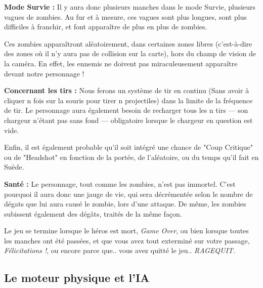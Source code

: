 \documentclass{article}
\begin{document}
\par
\textbf{Mode Survie :} Il y aura donc plusieurs manches dans le mode Survie, plusieurs vagues de zombies. Au fur et à mesure, ces vagues sont plus longues, sont plus difficiles à franchir, et font apparaître de plus en plus de zombies.
\newline

\par
Ces zombies apparaîtront aléatoirement, dans certaines zones libres (c'est-à-dire des zones où il n'y aura pas de collision sur la carte), hors du champ de vision de la caméra. En effet, les ennemis ne doivent pas miraculeusement apparaître devant notre personnage !
\newline



\newpage
\par
\textbf{Concernant les tirs :} Nous ferons un système de tir en continu (Sans avoir à cliquer n fois sur la souris pour tirer n projectiles) dans la limite de la fréquence de tir. Le personnage aura également besoin de recharger tous les n tirs --- son chargeur n'étant pas sans fond --- obligatoire lorsque le chargeur en question est vide.
\newline

\par
Enfin, il est également probable qu'il soit intégré une chance de "Coup Critique" ou de "Headshot" en fonction de la portée, de l'aléatoire, ou du temps qu'il fait en Suède.
\newline

\par
\textbf{Santé :} Le personnage, tout comme les zombies, n'est pas immortel. C'est pourquoi il aura donc une jauge de vie, qui sera décrémentée selon le nombre de dégats que lui aura causé le zombie, lors d'une attaque. De même, les zombies subissent également des dégâts, traités de la même façon.
\newline

\par
Le jeu se termine lorsque le héros est mort, \textit{Game Over}, ou bien lorsque toutes les manches ont été passées, et que vous avez tout exterminé sur votre passage, \textit{Félicitations !}, ou encore parce que.. vous avez quitté le jeu.. \textit{RAGEQUIT}.
\newline

\subsection{Le moteur physique et l'IA}
\end{document}
